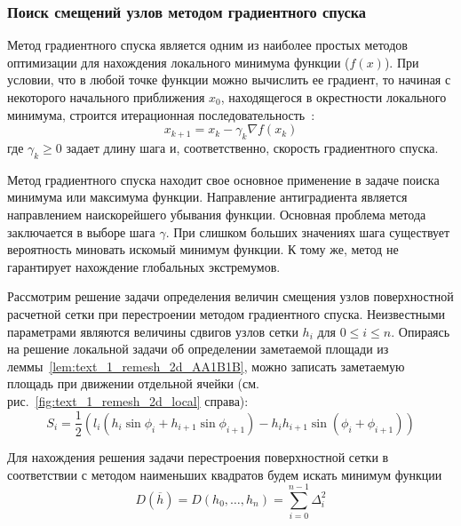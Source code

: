\subsubsection{Поиск смещений узлов методом градиентного спуска}

Метод градиентного спуска является одним из наиболее простых методов оптимизации для нахождения локального минимума функции ($f(x)$).
При условии, что в любой точке функции можно вычислить ее градиент, то начиная с некоторого начального приближения $x_0$, находящегося в окрестности локального минимума, строится итерационная последовательность~\cite{Kantorovich1984Func}:
\begin{equation}
x_{k+1} = x_k - \gamma_k \nabla f(x_k)
\end{equation}
где $\gamma_k \ge 0$ задает длину шага и, соответственно, скорость градиентного спуска.

Метод градиентного спуска находит свое основное применение в задаче поиска минимума или максимума функции.
Направление антиградиента является направлением наискорейшего убывания функции.
Основная проблема метода заключается в выборе шага $\gamma$.
При слишком больших значениях шага существует вероятность миновать искомый минимум функции.
К тому же, метод не гарантирует нахождение глобальных экстремумов.

Рассмотрим решение задачи определения величин смещения узлов поверхностной расчетной сетки при перестроении методом градиентного спуска.
Неизвестными параметрами являются величины сдвигов узлов сетки $h_i$ для $0 \le i \le n$.
Опираясь на решение локальной задачи об определении заметаемой площади из леммы~\ref{lem:text_1_remesh_2d_AA1B1B}, можно записать заметаемую площадь при движении отдельной ячейки (см. рис.~\ref{fig:text_1_remesh_2d_local} справа):
\begin{equation}
S_i = \frac{1}{2} \left( l_i(h_i \sin \phi_i + h_{i + 1} \sin \phi_{i+1}) - h_ih_{i + 1} \sin(\phi_i + \phi_{i+1}) \right)
\end{equation}

Для нахождения решения задачи перестроения поверхностной сетки в соответствии с методом наименьших квадратов будем искать минимум функции
\begin{equation}
D(\overline{h}) = D(h_0, \dots, h_{n}) = \sum_{i = 0}^{n - 1}{\Delta_i^2}
\end{equation}

